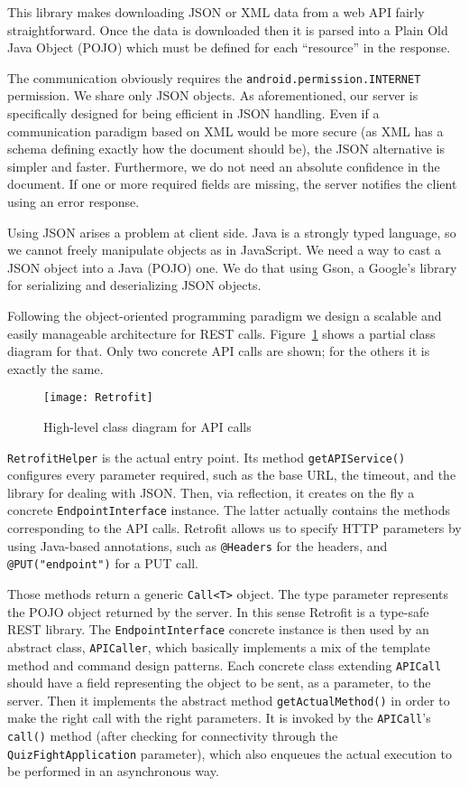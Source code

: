 This library makes downloading JSON or XML data from a web API fairly 
straightforward. Once the data is downloaded then it is parsed into a 
Plain Old Java Object (POJO) which must be defined for each ``resource'' 
in the response.

The communication obviously requires the \texttt{android.permission.INTERNET}
permission. We share only JSON objects. As aforementioned, our server is 
specifically designed for being efficient in JSON handling. Even if a 
communication paradigm based on XML would be more secure (as XML has a schema
defining exactly how the document should be), the JSON alternative is simpler 
and faster. Furthermore, we do not need an absolute confidence in the document. If
one or more required fields are missing, the server notifies the client using an
error response.

Using JSON arises a problem at client side. Java is a strongly typed language, so we
cannot freely manipulate objects as in JavaScript. We need a way to cast a JSON 
object into a Java (POJO) one. We do that using Gson, a Google's library for 
serializing and deserializing JSON objects. 

Following the object-oriented programming paradigm we design a scalable and easily 
manageable architecture for REST calls. Figure~\ref{fig:retrofit} shows a partial
class diagram for that. Only two concrete API calls are shown; for the others it 
is exactly the same.
\begin{figure}[h]
	\centering
	\texttt{[image: Retrofit]}
	\caption{High-level class diagram for API calls}
	\label{fig:retrofit}
\end{figure}

\texttt{RetrofitHelper} is the actual entry point. Its method \texttt{getAPIService()}
configures every parameter required, such as the base URL, the timeout, and the 
library for dealing with JSON. Then, via reflection, it creates on the fly a 
concrete \texttt{EndpointInterface} instance. The latter actually contains the
methods corresponding to the API calls. Retrofit allows us to specify HTTP
parameters by using Java-based annotations, such as \texttt{@Headers} for the
headers, and \texttt{@PUT("endpoint")} for a PUT call. 

Those methods return a generic \texttt{Call<T>} object. The type parameter 
represents the POJO object returned by the server. In this sense Retrofit is a
type-safe REST library. The \texttt{EndpointInterface} concrete instance is then
used by an abstract class, \texttt{APICaller}, which basically implements a mix
of the template method and command design patterns. Each concrete class extending
\texttt{APICall} should have a field representing the object to be sent, 
as a parameter, to the server. Then it implements the abstract method 
\texttt{getActualMethod()} in order to make the right call with the right 
parameters. It is invoked by the \texttt{APICall}'s \texttt{call()} method
(after checking for connectivity through the \texttt{QuizFightApplication}
parameter), which also enqueues the actual execution to be performed in
an asynchronous way.

